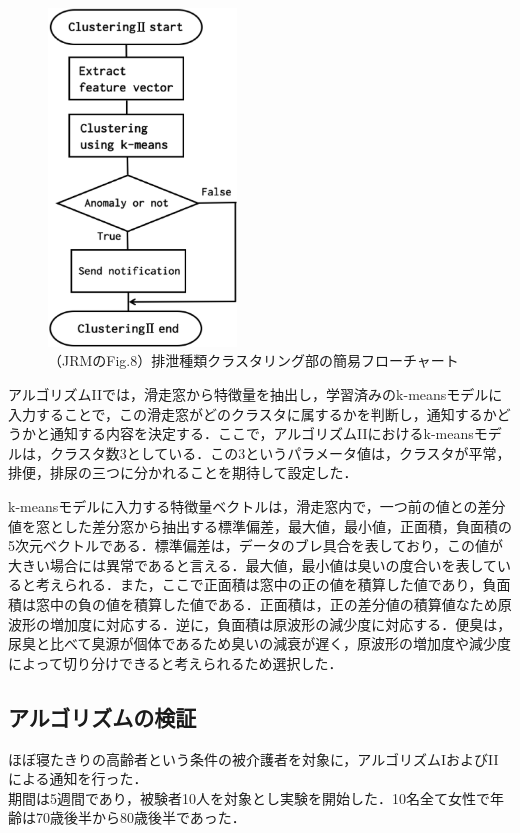 \begin{figure}[t]
\centering
\includegraphics[width=5cm]{./fig/detection2.eps}
\caption{（JRMのFig.8）排泄種類クラスタリング部の簡易フローチャート}
\label{cluster2}
\end{figure}

アルゴリズムI\hspace{-.1em}Iでは，滑走窓から特徴量を抽出し，学習済みのk-meansモデルに入力することで，この滑走窓がどのクラスタに属するかを判断し，通知するかどうかと通知する内容を決定する．ここで，アルゴリズムI\hspace{-.1em}Iにおけるk-meansモデルは，クラスタ数3としている．この3というパラメータ値は，クラスタが{平常，排便，排尿}の三つに分かれることを期待して設定した．

k-meansモデルに入力する特徴量ベクトルは，滑走窓内で，一つ前の値との差分値を窓とした差分窓から抽出する標準偏差，最大値，最小値，正面積，負面積の5次元ベクトルである．標準偏差は，データのブレ具合を表しており，この値が大きい場合には異常であると言える．最大値，最小値は臭いの度合いを表していると考えられる．また，ここで正面積は窓中の正の値を積算した値であり，負面積は窓中の負の値を積算した値である．正面積は，正の差分値の積算値なため原波形の増加度に対応する．逆に，負面積は原波形の減少度に対応する．便臭は，尿臭と比べて臭源が個体であるため臭いの減衰が遅く，原波形の増加度や減少度によって切り分けできると考えられるため選択した．

\subsection{アルゴリズムの検証}\label{chap:3.3.3}
ほぼ寝たきりの高齢者という条件の被介護者を対象に，アルゴリズムIおよびI\hspace{-.1em}Iによる通知を行った．\\
期間は5週間であり，被験者10人を対象とし実験を開始した．10名全て女性で年齢は70歳後半から80歳後半であった．

